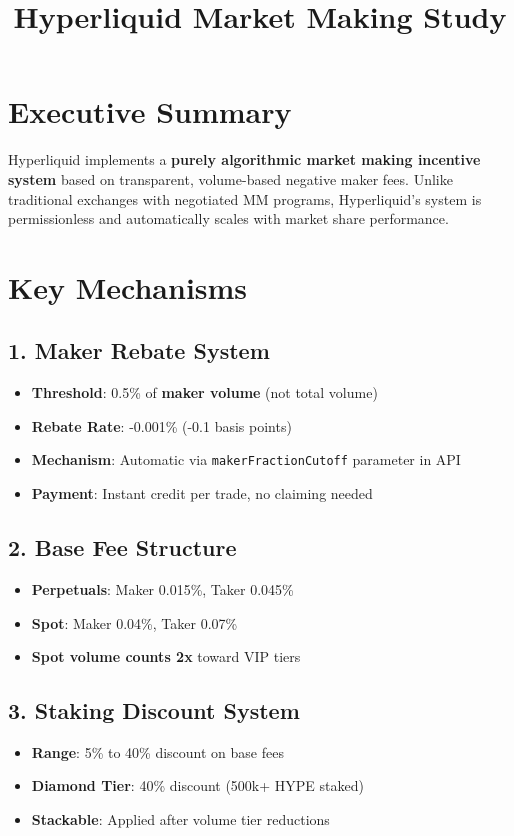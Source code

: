 \documentclass[11pt,a4paper]{article}
\title{Hyperliquid Market Making Study}
\author{}
\date{}
\begin{document}
\maketitle

\section{Executive Summary}

Hyperliquid implements a \textbf{purely algorithmic market making incentive system} based on transparent, volume-based negative maker fees. Unlike traditional exchanges with negotiated MM programs, Hyperliquid's system is permissionless and automatically scales with market share performance.

\section{Key Mechanisms}

\subsection{1. Maker Rebate System}
\begin{itemize}
    \item \textbf{Threshold}: 0.5\% of \textbf{maker volume} (not total volume)
    \item \textbf{Rebate Rate}: -0.001\% (-0.1 basis points)
    \item \textbf{Mechanism}: Automatic via \texttt{makerFractionCutoff} parameter in API
    \item \textbf{Payment}: Instant credit per trade, no claiming needed
\end{itemize}

\subsection{2. Base Fee Structure}
\begin{itemize}
    \item \textbf{Perpetuals}: Maker 0.015\%, Taker 0.045\%
    \item \textbf{Spot}: Maker 0.04\%, Taker 0.07\%
    \item \textbf{Spot volume counts 2x} toward VIP tiers
\end{itemize}

\subsection{3. Staking Discount System}
\begin{itemize}
    \item \textbf{Range}: 5\% to 40\% discount on base fees
    \item \textbf{Diamond Tier}: 40\% discount (500k+ HYPE staked)
    \item \textbf{Stackable}: Applied after volume tier reductions
\end{itemize}
\end{document}
